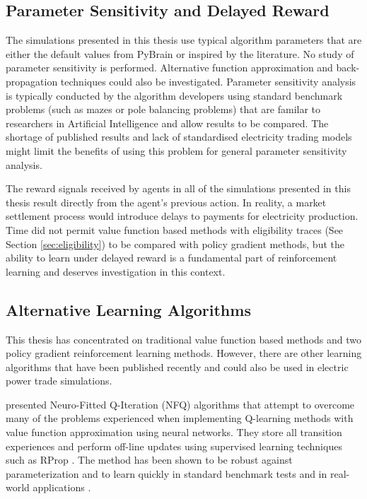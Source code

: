 \subsection{Parameter Sensitivity and Delayed Reward}
The simulations presented in this thesis use typical algorithm parameters that
are either the default values from PyBrain or inspired by the literature. No
study of parameter sensitivity is performed.  Alternative function
approximation and back-propagation techniques could also be investigated.
Parameter sensitivity analysis is typically conducted by the algorithm
developers using standard benchmark problems (such as mazes or pole balancing
problems) that are familar to researchers in Artificial Intelligence and allow
results to be compared. The shortage of published results and lack of
standardised electricity trading models might limit the benefits of using this
problem for general parameter sensitivity analysis.

The reward signals received by agents in all of the simulations presented in
this thesis result directly from the agent's previous action.  In
reality, a market settlement process would introduce delays to payments for
electricity production. Time did not permit value function based methods with
eligibility traces (See Section \ref{sec:eligibility}) to be compared with
policy gradient methods, but the ability to learn under delayed reward is a
fundamental part of reinforcement learning and deserves investigation in this
context.


\subsection{Alternative Learning Algorithms}
This thesis has concentrated on traditional value function based methods and
two policy gradient reinforcement learning methods.  However, there are other
learning algorithms that have been published recently and could also be
used in electric power trade simulations.

 presented Neuro-Fitted Q-Iteration (NFQ)
algorithms that attempt to overcome many of the problems experienced when implementing
Q-learning methods with value function approximation using neural networks.
They store all transition experiences and perform off-line updates using
supervised learning techniques such as RProp \cite{riedmiller93}.  The method
has been shown to be robust against parameterization and to learn quickly in
standard benchmark tests and in real-world applications \cite{kietzmann09}.

